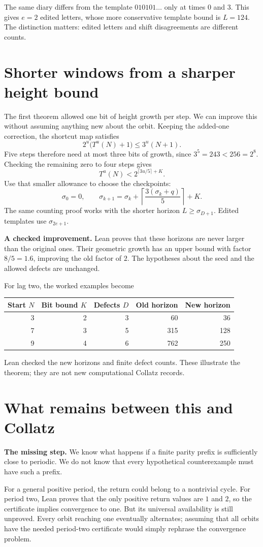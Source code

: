 \documentclass[11pt]{article}
\begin{document}
The same diary differs from the template $010101\ldots$ only at
times $0$ and $3$. This gives $e=2$ edited letters, whose more
conservative template bound is $L=124$. The distinction matters:
edited letters and shift disagreements are different counts.

\section{Shorter windows from a sharper height bound}
The first theorem allowed one bit of height growth per step. We can
improve this without assuming anything new about the orbit. Keeping
the added-one correction, the shortcut map satisfies
\[
2^u\bigl(T^u(N)+1\bigr)\le3^u(N+1).
\]
Five steps therefore need at most three bits of growth, since
$3^5=243<256=2^8$. Checking the remaining zero to four steps gives
\[
T^u(N)<2^{\lceil3u/5\rceil+K}.
\]
Use that smaller allowance to choose the checkpoints:
\[
\sigma_0=0,\qquad
\sigma_{k+1}=\sigma_k+\left\lceil\frac{3(\sigma_k+q)}5\right\rceil+K.
\]
The same counting proof works with the shorter horizon
$L\ge\sigma_{D+1}$. Edited templates use $\sigma_{2e+1}$.

\begin{keyidea}
\textbf{A checked improvement.} Lean proves that these horizons are
never larger than the original ones. Their geometric growth has an
upper bound with factor $8/5=1.6$, improving the old factor of $2$.
The hypotheses about the seed and the allowed defects are unchanged.
\end{keyidea}
\newpage
For lag two, the worked examples become
\begin{center}
\begin{tabular}{rrrrr}
\toprule
Start $N$&Bit bound $K$&Defects $D$&Old horizon&New horizon\\
\midrule
3&2&3&60&36\\
7&3&5&315&128\\
9&4&6&762&250\\
\bottomrule
\end{tabular}
\end{center}
Lean checked the new horizons and finite defect counts. These illustrate
the theorem; they are not new computational Collatz records.

\section{What remains between this and Collatz}
\begin{keyidea}
\textbf{The missing step.} We know what happens if a finite parity
prefix is sufficiently close to periodic. We do not know that every
hypothetical counterexample must have such a prefix.
\end{keyidea}
For a general positive period, the return could belong to a nontrivial
cycle. For period two, Lean proves that the only positive return values
are $1$ and $2$, so the certificate implies convergence to one.
But its universal availability is still unproved. Every orbit reaching
one eventually alternates; assuming that all orbits have the needed
period-two certificate would simply rephrase the convergence problem.
\end{document}
